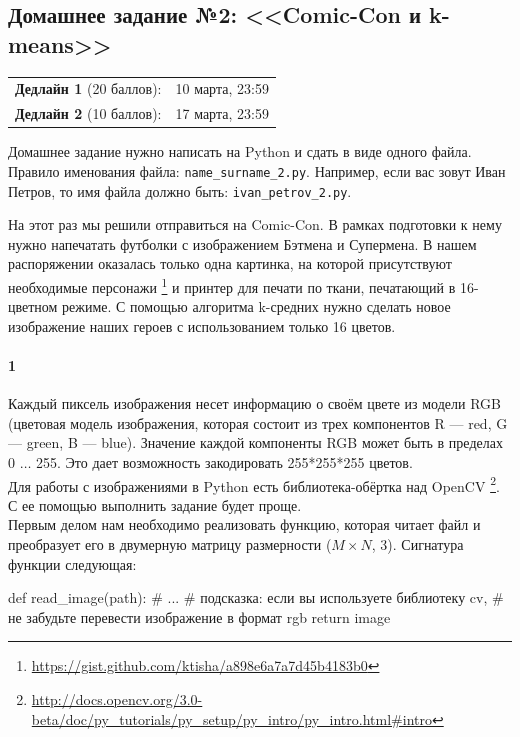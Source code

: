 \documentclass[a4paper,12pt]{article}
\begin{document}
\subsection*{Домашнее задание №2: <<Comic-Con и k-means>>}

\begin{tabular}{@{}lr}
  \textbf{Дедлайн 1} (20 баллов): & 10 марта, 23:59 \\
  \textbf{Дедлайн 2} (10 баллов): & 17 марта, 23:59
\end{tabular}

Домашнее задание нужно написать на Python и сдать в виде одного файла.
Правило именования файла: \texttt{name\_surname\_2.py}. Например, если
вас зовут Иван Петров, то имя файла должно быть: \texttt{ivan\_petrov\_2.py}.

\makebox[\linewidth]{\hrulefill}

На этот раз мы решили отправиться на Comic-Con. В рамках подготовки к нему нужно напечатать футболки с изображением Бэтмена и Супермена. В нашем распоряжении оказалась только одна картинка, на которой присутствуют необходимые персонажи%
\footnote{\url{https://gist.github.com/ktisha/a898e6a7a7d45b4183b0}} и принтер для печати по ткани, печатающий в 16-цветном режиме. С помощью алгоритма k-средних нужно сделать новое изображение наших героев с использованием только 16 цветов.

\paragraph{1} Каждый пиксель изображения несет информацию о своём цвете из модели RGB (цветовая модель изображения, которая состоит из трех компонентов R — red, G — green, B — blue). Значение каждой компоненты RGB может быть в пределах 0 $\dots $ 255. Это дает возможность закодировать 255*255*255 цветов.\\ 
Для работы с изображениями в Python есть библиотека-обёртка над OpenCV \footnote{\url{http://docs.opencv.org/3.0-beta/doc/py\_tutorials/py\_setup/py\_intro/py\_intro.html\#intro}}. С ее помощью выполнить задание будет проще.\\
Первым делом нам необходимо реализовать функцию, которая читает файл и преобразует его в двумерную матрицу  размерности ($M \times N	$, 3). 
Сигнатура функции следующая:
\begin{python3}
def read_image(path):
    # ...
    # подсказка: если вы используете библиотеку cv, 
    # не забудьте перевести изображение в формат rgb
    return image
\end{python3}
\end{document}
